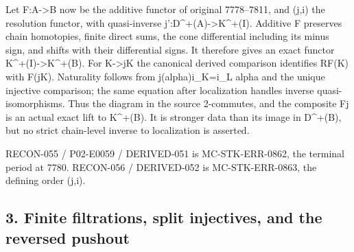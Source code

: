 Let F:\allowbreak{}A\allowbreak{}->B now be the additive functor of original 7778–\allowbreak{}7811,\allowbreak{} and (j,\allowbreak{}i)\allowbreak{} the resolution functor,\allowbreak{} with quasi-inverse j':\allowbreak{}D\textasciicircum{}\allowbreak{}+(A)\allowbreak{}\allowbreak{}->K\textasciicircum{}\allowbreak{}+(I)\allowbreak{}. Additive F preserves chain homotopies,\allowbreak{} finite direct sums,\allowbreak{} the cone differential including its minus sign,\allowbreak{} and shifts with their differential signs. It therefore gives an exact functor K\textasciicircum{}\allowbreak{}+(I)\allowbreak{}\allowbreak{}->K\textasciicircum{}\allowbreak{}+(B)\allowbreak{}. For K\allowbreak{}->jK the canonical derived comparison identifies RF(K)\allowbreak{} with F(jK)\allowbreak{}. Naturality follows from j(alpha)\allowbreak{}i\_\allowbreak{}K\allowbreak{}=i\_\allowbreak{}L alpha and the unique injective comparison; the same equation after localization handles inverse quasi-isomorphisms. Thus the diagram in the source 2-commutes,\allowbreak{} and the composite Fj\textquotesingle{} is an actual exact lift to K\textasciicircum{}\allowbreak{}+(B)\allowbreak{}. It is stronger data than its image in D\textasciicircum{}\allowbreak{}+(B)\allowbreak{},\allowbreak{} but no strict chain-level inverse to localization is asserted.

RECON-055 /\allowbreak{} P02-E0059 /\allowbreak{} DERIVED-051 is MC-STK-ERR-0862,\allowbreak{} the terminal period at 7780. RECON-056 /\allowbreak{} DERIVED-052 is MC-STK-ERR-0863,\allowbreak{} the defining order (j,\allowbreak{}i)\allowbreak{}.

\subsection{\texorpdfstring{3. Finite filtrations,\allowbreak{} split injectives,\allowbreak{} and the reversed pushout}{3. Finite  split  and the reversed pushout}}\label{proofs-7589-8350-finite-filtrations-split-injectives-and-the-reversed-pushout}

